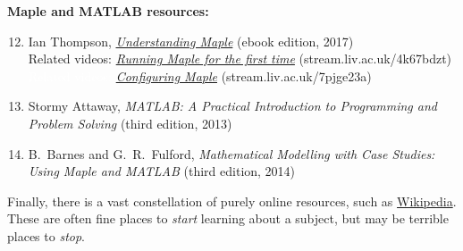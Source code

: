 \noindent\textbf{Maple and MATLAB resources:} \\[-24 pt]
\begin{enumerate}
  \setcounter{enumi}{11}
  \item Ian Thompson, \href{https://library.liv.ac.uk/record=b4395758~S8}{\textit{Understanding Maple}} (ebook edition, 2017) \\
        Related videos: \href{https://stream.liv.ac.uk/4k67bdzt}{\textit{Running Maple for the first time}} (stream.liv.ac.uk/4k67bdzt) \\
        \textcolor{white}{Related videos:} \href{https://stream.liv.ac.uk/7pjge23a}{\textit{Configuring Maple}} (stream.liv.ac.uk/7pjge23a)
  \item Stormy Attaway, \textit{MATLAB: A Practical Introduction to Programming and Problem Solving} (third edition, 2013)
  \item B.~Barnes and G.~R.~Fulford, \textit{Mathematical Modelling with Case Studies: Using Maple and MATLAB} (third edition, 2014)
\end{enumerate}

Finally, there is a vast constellation of purely online resources, such as \href{https://en.wikipedia.org/wiki/Statistical_physics}{Wikipedia}.
These are often fine places to \emph{start} learning about a subject, but may be terrible places to \emph{stop}.
